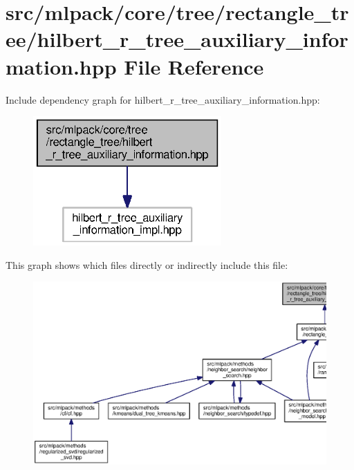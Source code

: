 \section{src/mlpack/core/tree/rectangle\+\_\+tree/hilbert\+\_\+r\+\_\+tree\+\_\+auxiliary\+\_\+information.hpp File Reference}
\label{hilbert__r__tree__auxiliary__information_8hpp}
Include dependency graph for hilbert\+\_\+r\+\_\+tree\+\_\+auxiliary\+\_\+information.\+hpp\+:
\nopagebreak
\begin{figure}[H]
\begin{center}
\leavevmode
\includegraphics[width=204pt]{hilbert__r__tree__auxiliary__information_8hpp__incl}
\end{center}
\end{figure}
This graph shows which files directly or indirectly include this file\+:
\nopagebreak
\begin{figure}[H]
\begin{center}
\leavevmode
\includegraphics[width=350pt]{hilbert__r__tree__auxiliary__information_8hpp__dep__incl}
\end{center}
\end{figure}
